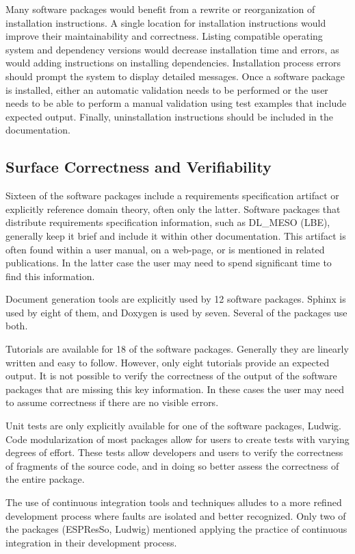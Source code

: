 \documentclass[12pt, notitlepage]{article}
\begin{document}
Many software packages would benefit from a rewrite or reorganization of installation instructions. A single location for installation instructions would improve their maintainability and correctness. Listing compatible operating system and dependency versions would decrease installation time and errors, as would adding instructions on installing dependencies. Installation process errors should prompt the system to display detailed messages. Once a software package is installed, either an automatic validation needs to be performed or the user needs to be able to perform a manual validation using test examples that include expected output. Finally, uninstallation instructions should be included in the documentation. 
 
\subsection{Surface Correctness and Verifiability}

Sixteen of the software packages include a requirements specification artifact or explicitly reference domain theory, often only the latter. Software packages that distribute requirements specification information, such as DL\_MESO (LBE), generally keep it brief and include it within other documentation. This artifact is often found within a user manual, on a web-page, or is mentioned in related publications. In the latter case the user may need to spend significant time to find this information. 

Document generation tools are explicitly used by 12 software packages. Sphinx is used by eight of them, and Doxygen is used by seven. Several of the packages use both.

Tutorials are available for 18 of the software packages. Generally they are linearly written and easy to follow. However, only eight tutorials provide an expected output. It is not possible to verify the correctness of the output of the software packages that are missing this key information. In these cases the user may need to assume correctness if there are no visible errors.

Unit tests are only explicitly available for one of the software packages, Ludwig. Code modularization of most packages allow for users to create tests with varying degrees of effort. These tests allow developers and users to verify the correctness of fragments of the source code, and in doing so better assess the correctness of the entire package.

The use of continuous integration tools and techniques alludes to a more refined development process where faults are isolated and better recognized. Only two of the packages (ESPResSo, Ludwig) mentioned applying the practice of continuous integration in their development process. 
\end{document}
